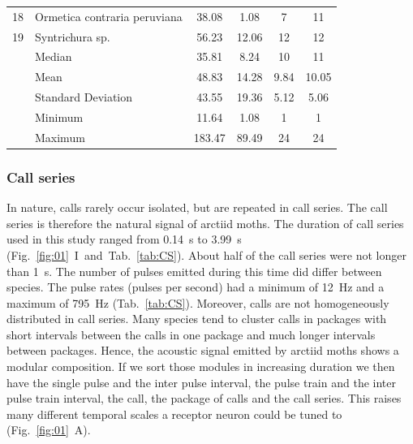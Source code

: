 \documentclass[12pt,a4paper,pdftex]{article}
\newcommand{\fig}[2]{(Fig.~#1~#2)}
\begin{document}
\begin{table}[h]
\begin{tabular}{llcccc}
		18           & Ormetica contraria peruviana & 38.08                                                & 1.08                                            & 7                                                         & 11                                                         \\
		19           & Syntrichura sp.                  & 56.23                                                & 12.06                                           & 12                                                        & 
		12   \\ \hline 
		& Median & 35.81 &	8.24 &	10 &	11 \\
		& Mean & 48.83 &	14.28	& 9.84 &	10.05 \\
		& Standard Deviation & 43.55 &	19.36 &	5.12	& 5.06 \\
		& Minimum & 11.64	& 1.08 &	1	& 1 \\
		& Maximum &183.47	& 89.49	& 24 &	24
		
		
		
		                                                    
	\end{tabular}
\end{table}

\subsubsection*{Call series}
In nature, calls rarely occur isolated, but are repeated in call series. The call series is therefore the natural signal of arctiid moths. The duration of call series used in this study ranged from 0.14~s to 3.99~s (Fig.~\ref{fig:01}~{I}~and~Tab.~\ref{tab:CS}). About half of the call series were not longer than 1~s. The number of pulses emitted during this time did differ between species. The pulse rates (pulses per second) had a minimum of 12~Hz and a maximum of 795~Hz (Tab.~\ref{tab:CS}). Moreover, calls are not homogeneously distributed in call series. Many species tend to cluster calls in packages with short intervals between the calls in one package and much longer intervals between packages. Hence, the acoustic signal emitted by arctiid moths shows a modular composition. If we sort those modules in increasing duration we then have the single pulse and the inter pulse interval, the pulse train and the inter pulse train interval, the call, the package of calls and the call series. This raises many different temporal scales a receptor neuron could be tuned to \fig{\ref{fig:01}}{A}. 
 
\end{document}
